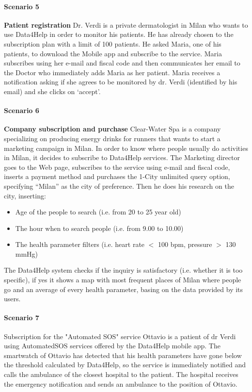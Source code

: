 \paragraph{Scenario 5} \textbf{Patient registration} \newline
Dr. Verdi is a private dermatologist in Milan who wants to use Data4Help in order to monitor his patients. He has already chosen to the  subscription plan with a limit of 100 patients. He asked Maria, one of his patients, to download the Mobile app and subscribe to the service.
Maria subscribes using her e-mail and fiscal code and then communicates her email to the Doctor who immediately adds Maria as her patient. Maria receives a notification asking if she agrees to be monitored by dr. Verdi (identified by his email) and she clicks on ‘accept’.



\paragraph{Scenario 6} \textbf{Company subscription and purchase} \newline
Clear-Water Spa is a company specializing on producing energy drinks for runners that wants to start a marketing campaign in Milan. In order to know where people usually do activities in Milan, it decides to subscribe to Data4Help services. The Marketing director goes to the Web page, subscribes to the service using e-mail and fiscal code, inserts a payment method and purchases the 1-City unlimited query option, specifying “Milan” as the city of preference.
Then he does his research on the city, inserting:
\begin{itemize}
    \item Age of the people to search (i.e. from 20 to 25 year old)
    \item The hour when to search people (i.e. from 9.00 to 10.00)
    \item The health parameter filters (i.e. heart rate $<$ 100 bpm, pressure $>$ 130 mmHg)
\end{itemize}
 The Data4Help system checks if the inquiry is satisfactory (i.e. whether it is too specific), if yes it shows a map with most frequent places of Milan where people go and an average of every health parameter, basing on the data provided by its users. 



\paragraph{Scenario 7}Subscription for the "Automated SOS" service \newline
Ottavio is a patient of dr Verdi using AutomatedSOS services offered by the Data4Help mobile app. The smartwatch of Ottavio has detected that his health parameters have gone below the threshold calculated by Data4Help, so the service is immediately notified and calls the ambulance of the closest hospital to the patient. The hospital receives the emergency notification  and sends an ambulance  to the position of Ottavio.


